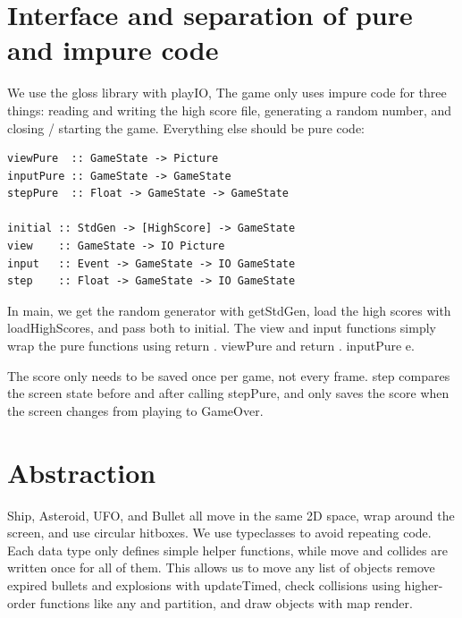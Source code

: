 \documentclass{article}
\begin{document}
\section{Interface and separation of pure and impure code}
We use the gloss library with playIO, The game only uses impure code for three things: reading and writing the high score file, generating a random number, and closing / starting the game. Everything else should be pure code:
\begin{lstlisting}
viewPure  :: GameState -> Picture
inputPure :: GameState -> GameState
stepPure  :: Float -> GameState -> GameState

initial :: StdGen -> [HighScore] -> GameState
view    :: GameState -> IO Picture
input   :: Event -> GameState -> IO GameState
step    :: Float -> GameState -> IO GameState
\end{lstlisting}
In main, we get the random generator with getStdGen, load the high scores with loadHighScores, and pass both to initial. The view and input functions simply wrap the pure functions using return . viewPure and return . inputPure e.

The score only needs to be saved once per game, not every frame. step compares the screen state before and after calling stepPure, and only saves the score when the screen changes from playing to GameOver.


\section{Abstraction}\label{sec:abstraction}
Ship, Asteroid, UFO, and Bullet all move in the same 2D space, wrap around the screen, and use circular hitboxes. We use typeclasses to avoid repeating code. Each data type only defines simple helper functions, while move and collides are written once for all of them.
This allows us to move any list of objects remove expired bullets and explosions with updateTimed, check collisions using higher-order functions like any and partition, and draw objects with map render.
\end{document}
